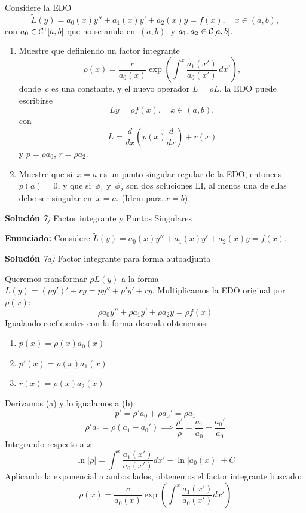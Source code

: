 \documentclass[11pt,spanish]{article}
\newcommand{\tder}[2]{\frac{d #1}{d #2}}
\newcounter{problema}
\newcommand{\prob}{\stepcounter{problema} \vspace{.5cm} \noindent{\bf Problema \arabic{problema}: }}
\begin{document}
\prob Considere la EDO
\[
\tilde{L}(y) = a_0(x)y'' + a_1(x) y' + a_2(x) y = f(x), \quad x\in (a,b),
\]
con $a_0\in{\cal C}^1[a,b]$ que no se anula en~$(a,b)$, y $a_1,a_2\in{\cal C}[a,b]$.
\begin{enumerate}
\item Muestre que definiendo un factor integrante
\[
\rho(x) = \frac{c}{a_0(x)} \exp\left(\int^x \frac{a_1(x')}{a_0(x')}\,dx'\right),
\]
donde~$c$ es una constante, y el nuevo operador $L=\rho\tilde{L}$, la EDO puede escribirse
\[
Ly = \rho f(x), \quad x\in (a,b),
\]
con
\[
L = \tder{}{x}\left( p(x)\tder{}{x} \right) + r(x)
\]
y $p=\rho a_0$, $r=\rho a_2$.
\item Muestre que si~$x=a$ es un punto singular regular de la EDO, entonces $p(a)=0$, y que si~$\phi_1$ y~$\phi_2$ son dos soluciones LI, al menos una de ellas debe ser singular en~$x=a$. (Idem para $x=b$).
\end{enumerate}



\vspace{0.5cm}
{\bf Soluci\'on }{\em 7)}
Factor integrante y Puntos Singulares
\vspace{0.5cm}

{\bf Enunciado:} Considere $\tilde{L}(y) = a_0(x)y'' + a_1(x) y' + a_2(x) y = f(x)$.

\vspace{0.5cm}
{\bf Soluci\'on }{\em 7a)}
Factor integrante para forma autoadjunta
\vspace{0.5cm}
 
Queremos transformar $\rho \tilde{L}(y)$ a la forma $L(y) = (p y')' + r y = p y'' + p' y' + r y$.
Multiplicamos la EDO original por $\rho(x)$:
$$\rho a_0 y'' + \rho a_1 y' + \rho a_2 y = \rho f(x)$$
Igualando coeficientes con la forma deseada obtenemos:
\begin{enumerate}
\item $p(x) = \rho(x) a_0(x)$
\item $p'(x) = \rho(x) a_1(x)$
\item $r(x) = \rho(x) a_2(x)$
\end{enumerate}
Derivamos (a) y lo igualamos a (b):
$$p' = \rho' a_0 + \rho a_0' = \rho a_1$$
$$\rho' a_0 = \rho(a_1 - a_0') \implies \frac{\rho'}{\rho} = \frac{a_1}{a_0} - \frac{a_0'}{a_0}$$
Integrando respecto a $x$:
$$\ln|\rho| = \int^x \frac{a_1(x')}{a_0(x')} dx' - \ln|a_0(x)| + C$$
Aplicando la exponencial a ambos lados, obtenemos el factor integrante buscado:
$$\rho(x) = \frac{c}{a_0(x)} \exp\left( \int^x \frac{a_1(x')}{a_0(x')} dx' \right)$$
\end{document}
